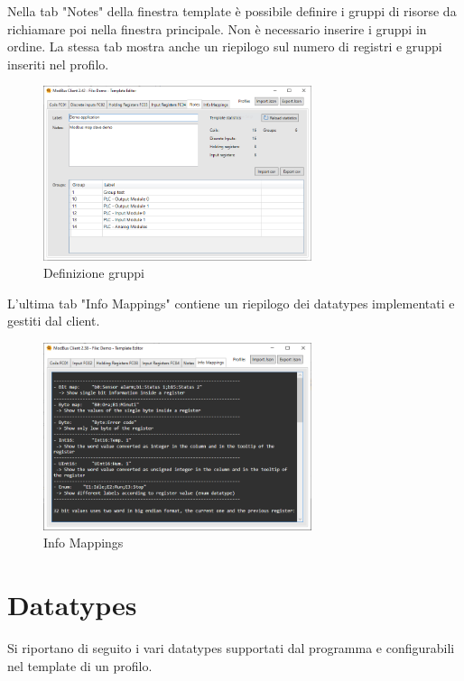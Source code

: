 Nella tab "Notes" della finestra template è possibile definire i gruppi di risorse
da richiamare poi nella finestra principale. Non è necessario inserire i gruppi in ordine.
La stessa tab mostra anche un riepilogo sul numero di registri e gruppi inseriti nel profilo.

\begin{figure}[H]
\centering
\includegraphics[width=0.70\textwidth]{../Img/ModBus_Client_Template_Group_Definition.PNG}
\caption{Definizione gruppi}
\end{figure}

L'ultima tab "Info Mappings" contiene un riepilogo dei datatypes implementati e gestiti dal client.

\begin{figure}[H]
\centering
\includegraphics[width=0.70\textwidth]{../Img/ModBus_Client_Template_Info_Mappings.PNG}
\caption{Info Mappings}
\end{figure}

\newpage
\section{Datatypes}

Si riportano di seguito i vari datatypes supportati dal programma e configurabili nel template di un profilo.

